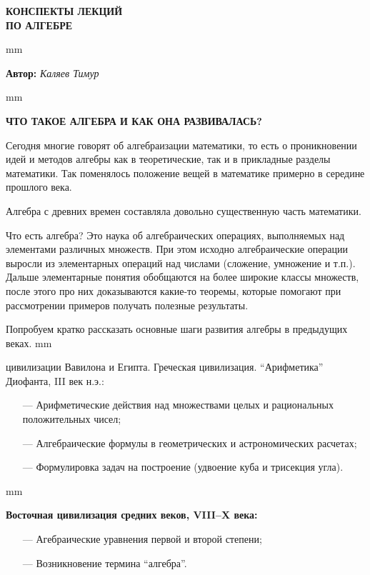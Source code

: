 \documentclass[12pt,english,russian]{article}
\begin{document}
		\begin{center}
			{\Huge {\bf КОНСПЕКТЫ ЛЕКЦИЙ\\ ПО АЛГЕБРЕ}  }
		\end{center}
	 mm
		\begin{center}
			{\large {\bf Автор:} \textit{Каляев Тимур}}
		\end{center}
		
	 mm
		\begin{center}
			{\large {\bf ЧТО ТАКОЕ АЛГЕБРА И КАК ОНА РАЗВИВАЛАСЬ?}}
		\end{center}
	
	
	Сегодня многие говорят об алгебраизации математики, то есть
	о проникновении идей и методов алгебры как в теоретические,
	так и в прикладные разделы математики. Так поменялось положение 
	вещей в математике примерно в середине прошлого века.
	
	Алгебра с древних времен составляла довольно существенную
	часть математики.
	
	Что есть алгебра? Это наука об алгебраических операциях, выполняемых 
	над элементами различных множеств. При этом исходно 
	алгебраические операции выросли из элементарных операций 
	над числами (сложение, умножение и т.п.). Дальше элементарные 
	понятия обобщаются на более широкие классы множеств,
	после этого про них доказываются какие-то теоремы, которые помогают 
	при рассмотрении примеров получать полезные результаты.
	
	Попробуем кратко рассказать основные шаги развития алгебры 
	в предыдущих веках.
	 mm
	
	{ цивилизации Вавилона и Египта. Греческая цивилизация. 
	“Арифметика” Диофанта, III век н.э.:}
	\begin{enumerate}
	\item[---] Арифметические действия над множествами целых и рациональных 
	положительных чисел;
	\item[---] Алгебраические формулы в геометрических и астрономических расчетах;
	\item[---] Формулировка задач на построение (удвоение куба и трисекция угла).
	\end{enumerate}
	
	 mm
	
	{\bf Восточная цивилизация средних веков, VIII–X века:}
	\begin{enumerate}
	\item[---] Агебраические уравнения первой и второй степени;
	\item[---] Возникновение термина “алгебра”.
	\end{enumerate}
	
\end{document}
